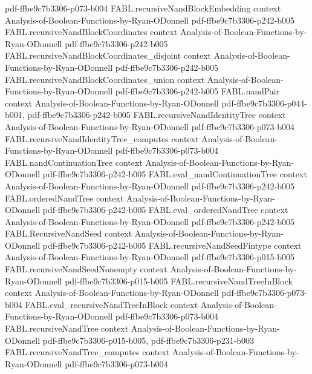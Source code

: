 \begin{theorem}
  {pdf-ffbe9c7b3306-p073-b004}
\proofstep
  {FABL.recursiveNandBlockEmbedding}
  {context}
  {Analysis-of-Boolean-Functions-by-Ryan-ODonnell}
  {pdf-ffbe9c7b3306-p242-b005}
\proofstep
  {FABL.recursiveNandBlockCoordinates}
  {context}
  {Analysis-of-Boolean-Functions-by-Ryan-ODonnell}
  {pdf-ffbe9c7b3306-p242-b005}
\proofstep
  {FABL.recursiveNandBlockCoordinates_disjoint}
  {context}
  {Analysis-of-Boolean-Functions-by-Ryan-ODonnell}
  {pdf-ffbe9c7b3306-p242-b005}
\proofstep
  {FABL.recursiveNandBlockCoordinates_union}
  {context}
  {Analysis-of-Boolean-Functions-by-Ryan-ODonnell}
  {pdf-ffbe9c7b3306-p242-b005}
\proofstep
  {FABL.nandPair}
  {context}
  {Analysis-of-Boolean-Functions-by-Ryan-ODonnell}
  {pdf-ffbe9c7b3306-p044-b001,
    pdf-ffbe9c7b3306-p242-b005}
\proofstep
  {FABL.recursiveNandIdentityTree}
  {context}
  {Analysis-of-Boolean-Functions-by-Ryan-ODonnell}
  {pdf-ffbe9c7b3306-p073-b004}
\proofstep
  {FABL.recursiveNandIdentityTree_computes}
  {context}
  {Analysis-of-Boolean-Functions-by-Ryan-ODonnell}
  {pdf-ffbe9c7b3306-p073-b004}
\proofstep
  {FABL.nandContinuationTree}
  {context}
  {Analysis-of-Boolean-Functions-by-Ryan-ODonnell}
  {pdf-ffbe9c7b3306-p242-b005}
\proofstep
  {FABL.eval_nandContinuationTree}
  {context}
  {Analysis-of-Boolean-Functions-by-Ryan-ODonnell}
  {pdf-ffbe9c7b3306-p242-b005}
\proofstep
  {FABL.orderedNandTree}
  {context}
  {Analysis-of-Boolean-Functions-by-Ryan-ODonnell}
  {pdf-ffbe9c7b3306-p242-b005}
\proofstep
  {FABL.eval_orderedNandTree}
  {context}
  {Analysis-of-Boolean-Functions-by-Ryan-ODonnell}
  {pdf-ffbe9c7b3306-p242-b005}
\proofstep
  {FABL.RecursiveNandSeed}
  {context}
  {Analysis-of-Boolean-Functions-by-Ryan-ODonnell}
  {pdf-ffbe9c7b3306-p242-b005}
\proofstep
  {FABL.recursiveNandSeedFintype}
  {context}
  {Analysis-of-Boolean-Functions-by-Ryan-ODonnell}
  {pdf-ffbe9c7b3306-p015-b005}
\proofstep
  {FABL.recursiveNandSeedNonempty}
  {context}
  {Analysis-of-Boolean-Functions-by-Ryan-ODonnell}
  {pdf-ffbe9c7b3306-p015-b005}
\proofstep
  {FABL.recursiveNandTreeInBlock}
  {context}
  {Analysis-of-Boolean-Functions-by-Ryan-ODonnell}
  {pdf-ffbe9c7b3306-p073-b004}
\proofstep
  {FABL.eval_recursiveNandTreeInBlock}
  {context}
  {Analysis-of-Boolean-Functions-by-Ryan-ODonnell}
  {pdf-ffbe9c7b3306-p073-b004}
\proofstep
  {FABL.recursiveNandTree}
  {context}
  {Analysis-of-Boolean-Functions-by-Ryan-ODonnell}
  {pdf-ffbe9c7b3306-p015-b005,
    pdf-ffbe9c7b3306-p231-b003}
\proofstep
  {FABL.recursiveNandTree_computes}
  {context}
  {Analysis-of-Boolean-Functions-by-Ryan-ODonnell}
  {pdf-ffbe9c7b3306-p073-b004}

\end{theorem}
